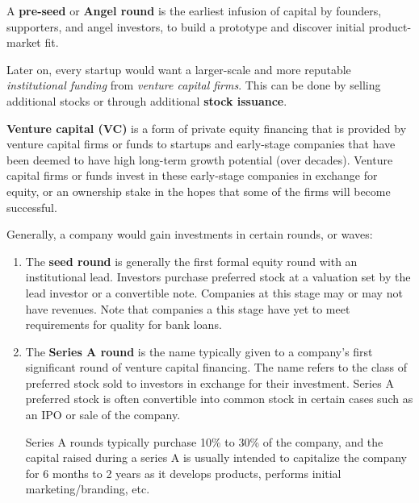 \documentclass{article}
\begin{document}
    \begin{definition}
      A \textbf{pre-seed} or \textbf{Angel round} is the earliest infusion of capital by founders, supporters, and angel investors, to build a prototype and discover initial product-market fit. 
    \end{definition}

    Later on, every startup would want a larger-scale and more reputable \textit{institutional funding} from \textit{venture capital firms}. This can be done by selling additional stocks or through additional \textbf{stock issuance}. 

    \begin{definition}
      \textbf{Venture capital (VC)} is a form of private equity financing that is provided by venture capital firms or funds to startups and early-stage companies that have been deemed to have high long-term growth potential (over decades). Venture capital firms or funds invest in these early-stage companies in exchange for equity, or an ownership stake in the hopes that some of the firms will become successful. 

      Generally, a company would gain investments in certain rounds, or waves:
      \begin{enumerate}
        \item The \textbf{seed round} is generally the first formal equity round with an institutional lead. Investors purchase preferred stock at a valuation set by the lead investor or a convertible note. Companies at this stage may or may not have revenues. Note that companies a this stage have yet to meet requirements for quality for bank loans. 
        \item The \textbf{Series A round} is the name typically given to a company's first significant round of venture capital financing. The name refers to the class of preferred stock sold to investors in exchange for their investment. Series A preferred stock is often convertible into common stock in certain cases such as an IPO or sale of the company. 
        
        Series A rounds typically purchase 10\% to 30\% of the company, and the capital raised during a series A is usually intended to capitalize the company for 6 months to 2 years as it develops products, performs initial marketing/branding, etc. 
        

\end{enumerate}
\end{definition}
\end{document}
